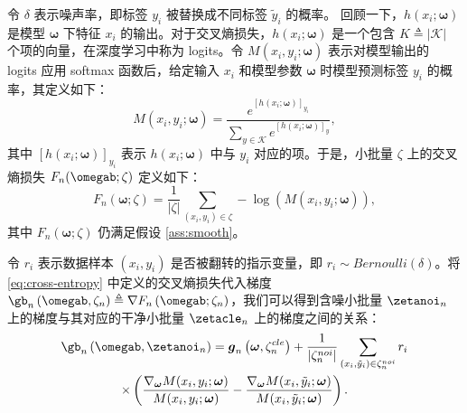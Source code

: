 令 $\delta$ 表示噪声率，即标签 $y_i$ 被替换成不同标签 $\tilde{y}_i$ 的概率。
回顾一下，$h\left(x_i;\boldsymbol{\omega}\right)$ 是模型 $\boldsymbol{\omega}$ 下特征 $x_i$ 的输出。对于交叉熵损失，$h\left(x_i;\boldsymbol{\omega}\right)$ 是一个包含 $K\triangleq|\mathcal{K}|$ 个项的向量，在深度学习中称为 logits。令 $ M(x_i, {y}_i; \boldsymbol{\omega}) $ 表示对模型输出的 logits 应用 softmax 函数后，给定输入 $x_i$ 和模型参数 $\boldsymbol{\omega}$ 时模型预测标签 $y_i$ 的概率，其定义如下：
\begin{equation}\label{eq:cross}
    M(x_i, {y}_i; \boldsymbol{\omega})= \frac{e^{[h\left(x_i;\boldsymbol{\omega}\right)]_{{y}_i}}}{\sum_{{y}\in\mathcal{K}}e^{[h\left(x_i;\boldsymbol{\omega}\right)]_{{y}}}},
\end{equation}
其中 $[h\left(x_i;\boldsymbol{\omega}\right)]_{{y}_i}$ 表示 $h\left(x_i;\boldsymbol{\omega}\right)$ 中与 ${y}_i$ 对应的项。于是，小批量 $\zeta$ 上的交叉熵损失 $F_{n}(\omegab;\zeta)$ 定义如下：
\begin{equation}\label{eq:cross-entropy}
F_n\left(\boldsymbol{\omega};\zeta\right)=\frac{1}{|\zeta|}\sum_{\left(x_i,y_i\right)\in \zeta}-\log\left(M(x_i, {y}_i; \boldsymbol{\omega})\right),
\end{equation}
其中 $F_n\left(\boldsymbol{\omega};\zeta\right)$ 仍满足假设 \ref{ass:smooth}。

令 $r_i$ 表示数据样本 $(x_i,y_i)$ 是否被翻转的指示变量，即 $r_i\sim Bernoulli(\delta)$。将 \eqref{eq:cross-entropy} 中定义的交叉熵损失代入梯度 $\gb_n\left(\omegab,\zeta_n\right)\triangleq \nabla F_n\left(\omegab;\zeta_n\right)$，我们可以得到含噪小批量 $\zetanoi_n$ 上的梯度与其对应的干净小批量 $\zetacle_n$ 上的梯度之间的关系：
\begin{multline}\label{Gradient of clean loss}
\gb_n\left(\omegab,\zetanoi_n\right) %
=\boldsymbol{g}_n\left(\boldsymbol{\omega},\zeta_n^{cle}\right)
+\frac{1}{|\zeta_n^{noi}|}\sum_{\left(x_i,\tilde{y}_i\right)\in \zeta_n^{noi}}r_i\\ \times\left(\frac{\nabla_{\boldsymbol{\omega}} M(x_i, y_i; \boldsymbol{\omega})}{M(x_i,  y_i; \boldsymbol{\omega})} -\frac{\nabla_{\boldsymbol{\omega}} M(x_i, \tilde{y}_i; \boldsymbol{\omega})}{M(x_i, \tilde{y}_i; \boldsymbol{\omega})}\right).
\end{multline}

